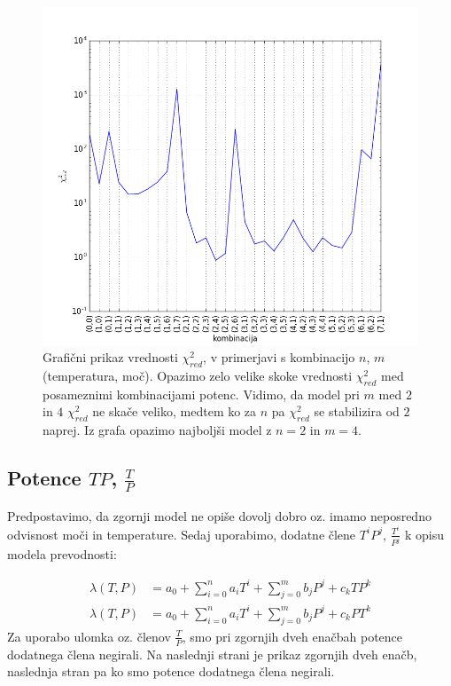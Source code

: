 \documentclass[slovene,11pt,a4paper]{article}
\numberwithin{equation}{section} %
\numberwithin{figure}{section} %
\numberwithin{table}{section} %
\begin{document}
\begin{figure}[ht]
\begin{center}
\includegraphics[scale=0.7]{slike/samo_potence_log.png}
\end{center}
\caption{Grafični prikaz vrednosti $\chi^2_{red}$, v primerjavi s kombinacijo $n$, $m$ (temperatura, moč). Opazimo zelo velike skoke vrednosti $\chi^2_{red}$ med posameznimi kombinacijami potenc. Vidimo, da model pri $m$ med $2$ in $4$ $\chi^2_{red}$ ne skače veliko, medtem ko za $n$ pa  $\chi^2_{red}$ se stabilizira od $2$ naprej. Iz grafa opazimo najboljši model z $n=2$ in $m=4$. }
\end{figure}


\subsection{Potence $TP$, $\frac{T}{P}$}
Predpostavimo, da zgornji model ne opiše dovolj dobro oz. imamo neposredno odvisnost moči in temperature. Sedaj uporabimo, dodatne člene $T^iP^j$, $\frac{T^i}{P^j}$ k opisu modela prevodnosti:

\begin{equation*}
\begin{aligned}
\lambda(T,P) &= a_0 + \sum_{i=0}^n a_i T^i + \sum_{j=0}^m b_j P^j +  c_k T P^k \\
\lambda(T,P) &= a_0 + \sum_{i=0}^n a_i T^i + \sum_{j=0}^m b_j P^j +  c_k P T^k
\end{aligned}
\end{equation*}
Za uporabo ulomka oz. členov $\frac{T}{P}$, smo pri zgornjih dveh enačbah potence dodatnega člena negirali. Na naslednji strani je prikaz zgornjih dveh enačb, naslednja stran pa ko smo potence dodatnega člena negirali.
\end{document}
